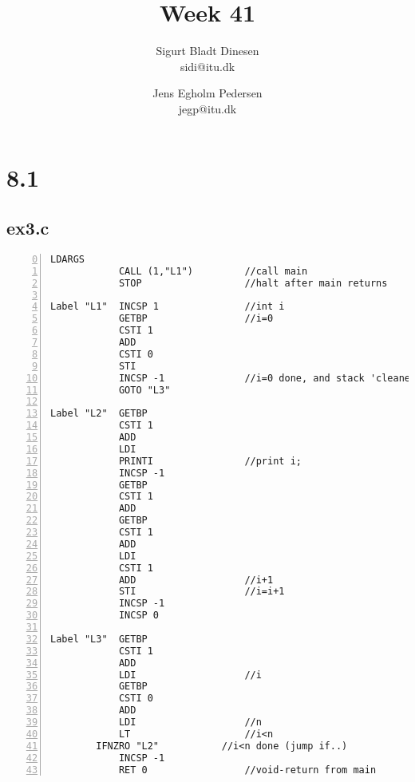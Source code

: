 \documentclass[a4paper, titlepage]{article}
\begin{document}
\title{Week 41}
\author{Sigurt Bladt Dinesen \\sidi{@}itu.dk \and Jens Egholm Pedersen \\jegp{@}itu.dk}
\maketitle
\section*{8.1}
\subsection*{ex3.c}
\begin{lstlisting}[numbers=left, firstnumber=0, title=ex3.c]
            LDARGS
            CALL (1,"L1")         //call main
            STOP                  //halt after main returns

Label "L1"  INCSP 1               //int i
            GETBP                 //i=0
            CSTI 1
            ADD
            CSTI 0
            STI
            INCSP -1              //i=0 done, and stack 'cleaned'
            GOTO "L3"

Label "L2"  GETBP
            CSTI 1
            ADD
            LDI
            PRINTI                //print i;
            INCSP -1
            GETBP
            CSTI 1
            ADD
            GETBP
            CSTI 1
            ADD
            LDI
            CSTI 1
            ADD                   //i+1
            STI                   //i=i+1
            INCSP -1
            INCSP 0

Label "L3"  GETBP
            CSTI 1
            ADD
            LDI                   //i
            GETBP
            CSTI 0
            ADD
            LDI                   //n
            LT                    //i<n
	    IFNZRO "L2"           //i<n done (jump if..)
            INCSP -1
            RET 0                 //void-return from main
\end{lstlisting}
\end{document}
